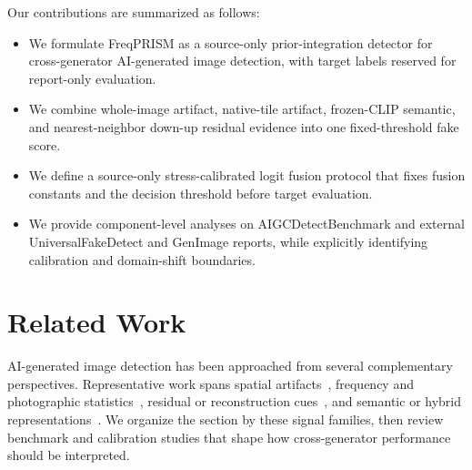 \documentclass[lettersize,journal]{IEEEtran}
\begin{document}
Our contributions are summarized as follows:
\begin{itemize}
    \item We formulate FreqPRISM as a source-only prior-integration detector for cross-generator AI-generated image detection, with target labels reserved for report-only evaluation.
    \item We combine whole-image artifact, native-tile artifact, frozen-CLIP semantic, and nearest-neighbor down-up residual evidence into one fixed-threshold fake score.
    \item We define a source-only stress-calibrated logit fusion protocol that fixes fusion constants and the decision threshold before target evaluation.
    \item We provide component-level analyses on AIGCDetectBenchmark and external UniversalFakeDetect and GenImage reports, while explicitly identifying calibration and domain-shift boundaries.
\end{itemize}

\section{Related Work}
\label{sec:related_work}

AI-generated image detection has been approached from several complementary perspectives. Representative work spans spatial artifacts~\cite{wang2020cnnspot,liu2020gramnet,zhong2023patchcraft}, frequency and photographic statistics~\cite{frank2020frequency,liu2022realimages,zhong2025beyond}, residual or reconstruction cues~\cite{tan2023lgrad,tan2024npr,wang2023dire}, and semantic or hybrid representations~\cite{radford2021clip,ojha2023univfd,yan2025aide,cheng2025cospy}. We organize the section by these signal families, then review benchmark and calibration studies that shape how cross-generator performance should be interpreted.
\end{document}
